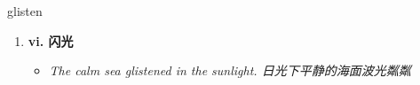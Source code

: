 
\begin{frame}
{\huge glisten}
\begin{center}
\begin{enumerate}\Large
  \item \textbf{vi. 闪光}
  \begin{itemize}
    \item \em{\Large{The calm sea glistened in the sunlight. 日光下平静的海面波光粼粼}}
  \end{itemize}
\end{enumerate}
\end{center}
\end{frame}
